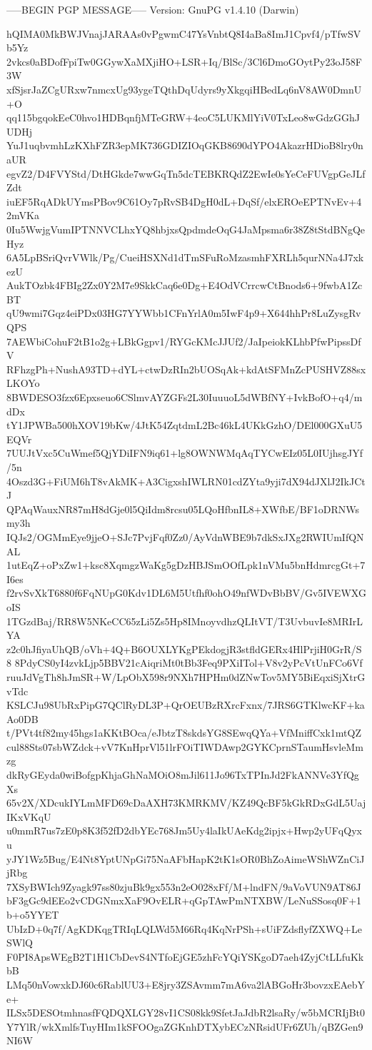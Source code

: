 -----BEGIN PGP MESSAGE-----
Version: GnuPG v1.4.10 (Darwin)

hQIMA0MkBWJVnajJARAAs0vPgwmC47YsVnbtQ8I4aBa8ImJ1Cpvf4/pTfwSVb5Yz
2vkcs0aBDofFpiTw0GGywXaMXjiHO+LSR+Iq/BlSc/3Cl6DmoGOytPy23oJ58F3W
xfSjsrJaZCgURxw7nmcxUg93ygeTQthDqUdyrs9yXkgqiHBedLq6nV8AW0DmnU+O
qq115bgqokEeC0hvo1HDBqnfjMTeGRW+4eoC5LUKMlYiV0TxLeo8wGdzGGhJUDHj
YuJ1uqbvmhLzKXhFZR3epMK736GDIZIOqGKB8690dYPO4AkazrHDioB8lry0naUR
egvZ2/D4FVYStd/DtHGkde7wwGqTn5dcTEBKRQdZ2EwIe0sYeCeFUVgpGeJLfZdt
iuEF5RqADkUYmsPBov9C61Oy7pRvSB4DgH0dL+DqSf/elxEROeEPTNvEv+42mVKa
0Iu5WwjgVumIPTNNVCLhxYQ8hbjxsQpdmdeOqG4JaMpsma6r38Z8tStdBNgQeHyz
6A5LpBSriQvrVWlk/Pg/CueiHSXNd1dTmSFuRoMzasmhFXRLh5qurNNa4J7xkezU
AukTOzbk4FBIg2Zx0Y2M7e9SkkCaq6e0Dg+E4OdVCrrcwCtBnods6+9fwbA1ZcBT
qU9wmi7Gqz4eiPDx03HG7YYWbb1CFnYrlA0m5IwF4p9+X644hhPr8LuZysgRvQPS
7AEWbiCohuF2tB1o2g+LBkGgpv1/RYGcKMcJJUf2/JaIpeiokKLhbPfwPipssDfV
RFhzgPh+NushA93TD+dYL+ctwDzRIn2bUOSqAk+kdAtSFMnZcPUSHVZ88sxLKOYo
8BWDESO3fzx6Epxseuo6CSlmvAYZGFs2L30IuuuoL5dWBfNY+IvkBofO+q4/mdDx
tY1JPWBa500hXOV19bKw/4JtK54ZqtdmL2Bc46kL4UKkGzhO/DEl000GXuU5EQVr
7UUJtVxc5CuWmef5QjYDiIFN9iq61+lg8OWNWMqAqTYCwEIz05L0IUjhsgJYf/5n
4Oszd3G+FiUM6hT8vAkMK+A3CigxshIWLRN01cdZYta9yji7dX94dJXlJ2IkJCtJ
QPAqWauxNR87mH8dGje0l5QiIdm8rcsu05LQoHfbnIL8+XWfbE/BF1oDRNWsmy3h
IQJs2/OGMmEye9jjeO+SJc7PvjFqf0Zz0/AyVdnWBE9b7dkSxJXg2RWIUmIfQNAL
1utEqZ+oPxZw1+ksc8XqmgzWaKg5gDzHBJSmOOfLpk1nVMu5bnHdmrcgGt+7I6es
f2rvSvXkT6880f6FqNUpG0Kdv1DL6M5Utfhf0ohO49nfWDvBbBV/Gv5IVEWXGoIS
1TGzdBaj/RR8W5NKeCC65zLi5Zs5Hp8IMnoyvdhzQLItVT/T3UvbuvIe8MRIrLYA
z2c0hJfiyaUhQB/oVh+4Q+B6OUXLYKgPEkdogjR3stfldGERx4HlPrjiH0GrR/S8
8PdyCS0yI4zvkLjp5BBV21cAiqriMt0tBb3Feq9PXiITol+V8v2yPcVtUnFCo6Vf
ruuJdVgTh8hJmSR+W/LpObX598r9NXh7HPHm0dZNwTov5MY5BiEqxiSjXtrGvTdc
KSLCJu98UbRxPipG7QClRyDL3P+QrOEUBzRXrcFxnx/7JRS6GTKlwcKF+kaAo0DB
t/PVt4tf82my45hgs1aKKtBOca/eJbtzT8skdsYG8SEwqQYa+VfMniffCxk1mtQZ
cul88Sts07sbWZdck+vV7KnHprVl51lrFOiTIWDAwp2GYKCprnSTaumHsvleMmzg
dkRyGEyda0wiBofgpKhjaGhNaMOiO8mJil611Jo96TxTPInJd2FkANNVe3YfQgXs
65v2X/XDcukIYLmMFD69cDaAXH73KMRKMV/KZ49QcBF5kGkRDxGdL5UajIKxVKqU
u0mmR7us7zE0p8K3f52fD2dbYEc768Jm5Uy4laIkUAeKdg2ipjx+Hwp2yUFqQyxu
yJY1Wz5Bug/E4Nt8YptUNpGi75NaAFbHapK2tK1sOR0BhZoAimeWShWZnCiJjRbg
7XSyBWIch9Zyagk97ss80zjuBk9gx553n2eO028xFf/M+lndFN/9aVoVUN9AT86J
bF3gGc9dEEo2vCDGNmxXaF9OvELR+qGpTAwPmNTXBW/LeNuSSosq0F+1b+o5YYET
UbIzD+0q7f/AgKDKqgTRIqLQLWd5M66Rq4KqNrPSh+sUiFZdsflyfZXWQ+LeSWlQ
F0PI8ApsWEgB2T1H1CbDevS4NTfoEjGE5zhFcYQiYSKgoD7aeh4ZyjCtLLfuKkbB
LMq50nVowxkDJ60c6RablUU3+E8jry3ZSAvmm7mA6va2lABGoHr3bovzxEAebYe+
ILSx5DESOtmhnasfFQDQXLGY28vI1CS08kk9SfetJaJdbR2lsaRy/w5bMCRIjBt0
Y7YlR/wkXmlfsTuyHIm1kSFOOgaZGKnhDTXybECzNRsidUFr6ZUh/qBZGen9NI6W
